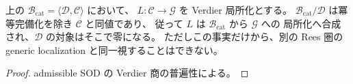 \begin{proposition}
上の $\mathcal B_{\mathrm{cat}}=\langle\mathcal D,\mathcal C\rangle$ において、
$L:\mathcal C\to\mathcal G$ を Verdier 局所化とする。
$\mathcal B_{\mathrm{cat}}/\mathcal D$ は冪等完備化を除き $\mathcal C$ と同値であり、
従って $L$ は $\mathcal B_{\mathrm{cat}}$ から $\mathcal G$ への
局所化へ合成され、$\mathcal D$ の対象はそこで零になる。
ただしこの事実だけから、別の Rees 圏の generic localization と同一視することはできない。
\end{proposition}
\begin{proof}
admissible SOD の Verdier 商の普遍性による。
\end{proof}
